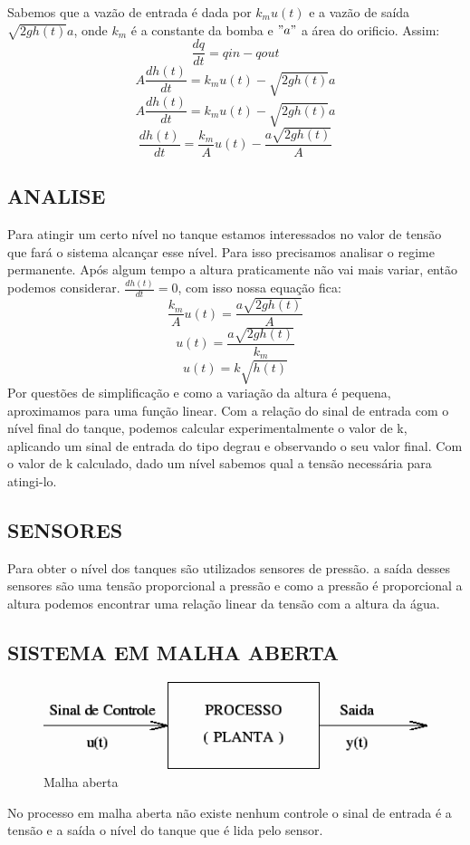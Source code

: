 \documentclass[a4paper,12pt]{article}
\begin{document}
\hspace{4ex}Sabemos que a vazão de entrada é dada por $ k_mu(t) $ e a vazão de saída $ \sqrt{2gh(t)}a $, onde $k_m$ é a constante da bomba e $"a"$ a área do orificio. Assim: 
\[ \frac{dq}{dt}=qin-qout\]
\[ A\frac{dh(t)}{dt}=k_mu(t)-\sqrt{2gh(t)}a \]
\[ A\frac{dh(t)}{dt}=k_mu(t)-\sqrt{2gh(t)}a \]
\[ \frac{dh(t)}{dt}= \frac{k_m}{A}u(t)- \frac{a\sqrt{2gh(t)}}{A} \]

\subsection{ANALISE}
\hspace{4ex}Para atingir um certo nível no tanque estamos interessados no valor de tensão que fará o sistema alcançar esse nível. Para isso precisamos analisar o regime permanente. Após algum tempo a altura praticamente não vai mais variar, então podemos considerar.  $\frac{dh(t)}{dt}=0 $, com isso nossa equação fica:
\[ \frac{k_m}{A}u(t)= \frac{a\sqrt{2gh(t)}}{A} \]
\[ u(t)=  \frac{a\sqrt{2gh(t)}}{k_m}\]
\begin{equation}\label{eq:1}
u(t)=k\sqrt{h(t)}
\end{equation}
\hspace{4ex}Por questões de simplificação e como a variação da altura é pequena, aproximamos para uma função linear. Com a relação do sinal de entrada com o nível final do tanque, podemos calcular experimentalmente o valor de k, aplicando um sinal de entrada do tipo degrau e observando o seu valor final.
Com o valor de k calculado, dado um nível sabemos qual a tensão necessária para atingi-lo.

\subsection{SENSORES}
\hspace{4ex}Para obter o nível dos tanques são utilizados sensores de pressão. a saída desses sensores são uma tensão proporcional a pressão e como a pressão é proporcional a altura podemos encontrar uma relação linear da tensão com a altura da água.


\subsection{SISTEMA EM MALHA ABERTA}
\begin{figure}[H]
\includegraphics[width=15cm]{malhaAberta.png}
\caption{Malha aberta}
\label{fig:malhaAberta}
\end{figure}
\hspace{4ex}No processo em malha aberta não existe nenhum controle o sinal de entrada é a tensão e a saída o nível do tanque que é lida pelo sensor.
\end{document}
